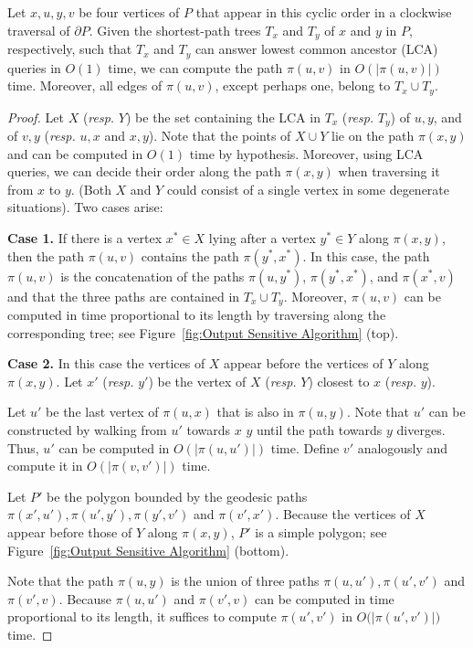 \documentclass[a4paper,UKenglish]{lipics}
\newcommand{\p}[2]{\ensuremath{\pi(#1, #2)}}
\begin{document}
\begin{lemma}\label{lemma:Suri's lemma}
Let $x, u, y, v$ be four vertices of $P$ that appear in this cyclic order in a clockwise traversal of $\partial P$.
Given the shortest-path trees $T_x$ and $T_y$ of $x$ and $y$ in $P$, respectively, such that $T_x$ and $T_y$ can answer lowest common ancestor (LCA) queries in $O(1)$ time, 
we can compute the path $\p{u}{v}$ in $O(|\p{u}{v}|)$ time. 
Moreover, all edges of $\p{u}{v}$, except perhaps one, belong to $T_x\cup T_y$.
\end{lemma}
\begin{proof}
Let $X$ (\emph{resp.} $Y$) be the set containing the LCA in $T_x$ (\emph{resp.} $T_y$) of $u,y$, and of $v,y$ (\emph{resp.} $u,x$ and $x,y$). Note that the points of $X\cup Y$ lie on the path $\p{x}{y}$ and can be computed in $O(1)$ time by hypothesis. Moreover, using LCA queries, we can decide their order along the path $\p{x}{y}$ when traversing it from $x$ to $y$. (Both $X$ and $Y$ could consist of a single vertex in some degenerate situations). Two cases arise: 

\textbf{Case 1.} If there is a vertex  $x^*\in X$ lying after a vertex $y^*\in Y$ along $\p{x}{y}$, 
then the path $\p{u}{v}$ contains the path $\p{y^*}{x^*}$. 
In this case, the path $\p{u}{v}$ is the concatenation of the paths $\p{u}{y^*}$, $\p{y^*}{x^*}$, and $\p{x^*}{v}$ and that the three paths are contained in $T_x \cup T_y$.
Moreover, $\p{u}{v}$ can be computed in time proportional to its length by traversing along the corresponding tree; see Figure~\ref{fig:Output Sensitive Algorithm} (top).

\textbf{Case 2.} In this case the vertices of $X$ appear before the vertices of $Y$ along $\p{x}{y}$.
Let $x'$ (\emph{resp.} $y'$) be the vertex of $X$ (\emph{resp.} $Y$) closest to $x$ (\emph{resp.} $y$). 

Let $u'$ be the last vertex of $\p{u}{x}$ that is also in $\p{u}{y}$.
Note that $u'$ can be constructed by walking from $u'$ towards $x$ $y$ until the path towards $y$ diverges. 
Thus, $u'$ can be computed in $O(|\p{u}{u'}|)$ time. 
Define $v'$ analogously and compute it in $O(|\p{v}{v'}|)$ time.

Let $P'$ be the polygon bounded by the geodesic paths $\p{x'}{u'}, \p{u'}{y'}, \p{y'}{v'}$ and  $\p{v'}{x'}$.
Because the vertices of $X$ appear before those of $Y$ along $\p{x}{y}$, $P'$ is a simple polygon; see Figure~\ref{fig:Output Sensitive Algorithm} (bottom).

Note that the path $\p{u}{y}$ is the union of three paths $\p{u}{u'}, \p{u'}{v'}$ and $\p{v'}{v}$.
Because $\p{u}{u'}$ and  $\p{v'}{v}$ can be computed in time proportional to its length, it suffices to compute $\p{u'}{v'}$ in $O(|$\p{u'}{v'}$|)$ time.


\end{proof}
\end{document}
